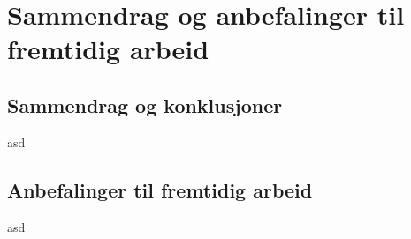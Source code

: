 \section[Sammendrag]{Sammendrag og anbefalinger til fremtidig arbeid}
\subsection{Sammendrag og konklusjoner}
asd
\subsection{Anbefalinger til fremtidig arbeid}
asd
